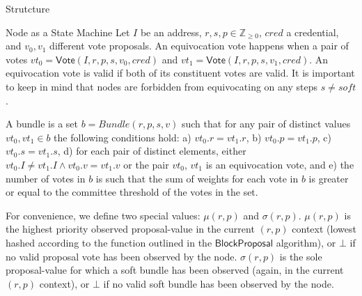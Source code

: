 \documentclass[10pt,a4paper]{article}
\begin{document}
\begin{section}{Strutcture}
\begin{subsection}{Node as a State Machine}
Let $I$ be an address, $r, s, p\in\mathbb{Z}_{\ge 0}$, $cred$ a credential, and $v_0,v_1$ different
vote proposals.
An {\sf equivocation vote} happens when a pair of votes
$vt_0 = \mathsf{Vote}(I, r, p, s, v_0, cred)$ and $vt_1 = \mathsf{Vote}(I, r, p, s, v_1, cred)$.
An equivocation vote is valid if both of its constituent votes are valid.
It is important to keep in mind that nodes are forbidden from equivocating 
on any steps $s \neq soft$.

A {\sf bundle} is a set $b = Bundle(r,p,s,v)$ such that for any pair of distinct values 
$vt_0, vt_1 \in b$ the following conditions hold: 
a) $vt_0.r = vt_1.r $, 
b) $vt_0.p = vt_1.p$,
c) $vt_0.s = vt_1.s$,
d) for each pair of distinct elements, either $vt_0.I \neq vt_1.I \land vt_0.v = vt_1.v$ or the pair $vt_0$, $vt_1$ 
is an equivocation vote, and
e) the number of votes in $b$ is such that the sum of weights for each vote in $b$ is greater or equal to the
committee threshold of the votes in the set.

For convenience, we define two special values: $\mu(r,p)$ and $\sigma(r,p)$.
$\mu(r,p)$ is the highest priority observed proposal-value in the current $(r,p)$ context 
(lowest hashed according to the function outlined in the $\mathsf{BlockProposal}$ algorithm), 
or $\bot$ if no valid proposal vote has been observed by the node.
$\sigma(r,p)$ is the sole proposal-value for which a soft bundle has been observed (again, 
in the current $(r,p)$ context), or $\bot$ if no valid soft bundle has been observed by the 
node.
\end{subsection}

\end{section}
\end{document}
